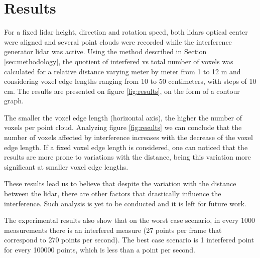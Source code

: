 \documentclass[extendedabs]{recpad2k}
\begin{document}



\section{Results}
For a fixed \gls{lidar} height, direction and rotation speed, both \gls{lidar}s optical center were aligned and several point clouds were recorded while the interference generator \gls{lidar} was active. Using the method described in Section \ref{sec:methodology}, the quotient of interfered vs total number of voxels was calculated for a relative distance varying meter by meter from 1 to 12 m and considering voxel edge lengths ranging from 10 to 50 centimeters, with steps of 10 cm. The results are presented on figure \ref{fig:results}, on the form of a contour graph. 

The smaller the voxel edge length (horizontal axis), the higher the number of voxels per point cloud. Analyzing figure \ref{fig:results} we can conclude that the number of voxels affected by interference increases with the decrease of the voxel edge length. If a fixed voxel edge length is considered, one can noticed that the results are more prone to variations with the distance, being this variation more significant at smaller voxel edge lengths.


These results lead us to believe that despite the variation with the distance between the \gls{lidar}, there are other factors that drastically influence the interference. Such analysis is yet to be conducted and it is left for future work.

The experimental results also show that on the worst case scenario, in every 1000 measurements there is an interfered measure (27 points per frame that correspond to 270 points per second). The best case scenario is 1 interfered point for every 100000 points, which is less than a point per second.
\end{document}
